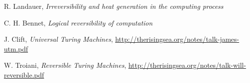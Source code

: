 \documentclass[12pt]{article}
\theoremstyle{plain}
\theoremstyle{definition}
\begin{document}
	\begin{thebibliography}{9}
		 R. Landauer, \emph{Irreversibility and heat generation in the computing process}
		
		 C. H. Bennet, \emph{Logical reversibility of computation}
		
		 J. Clift, \emph{Universal Turing Machines}, \url{http://therisingsea.org/notes/talk-james-utm.pdf}
		
		 W. Troiani, \emph{Reversible Turing Machines}, \url{http://therisingsea.org/notes/talk-will-reversible.pdf}
		\end{thebibliography}
	
	
	
	
	
	
	
	
	
	
	
	
	
	
	
	
	
	
	
	
	
	
	
\end{document}
